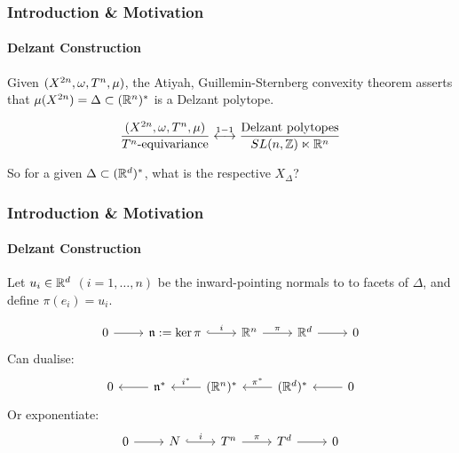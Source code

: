 \begin{frame}
	\frametitle{Introduction \& Motivation}
	\framesubtitle{Delzant Construction}
	
	\begin{rmk}
		Given $(X^{2n}, \omega, T^{n}, \mu)$, the Atiyah, Guillemin-Sternberg convexity theorem asserts that $\mu(X^{2n}) = \Delta \subset (\mathbb{R}^{n})^{\ast}$ is a Delzant polytope.
	\end{rmk}
	
	\begin{thm}[Delzant]
		$$
		\frac{(X^{2n}, \omega,T^{n},\mu)}{T^{n}\text{-equivariance}} \overset{1-1}{\longleftrightarrow} \frac{\text{Delzant polytopes}}{SL(n,\mathbb{Z}) \ltimes \mathbb{R}^{n}}
		$$
	\end{thm}
	
	\begin{qstn}
		So for a given $\Delta \subset (\mathbb{R}^{d})^{\ast}$, what is the respective $X_{\Delta}$?
	\end{qstn}


\end{frame}

\begin{frame}
	\frametitle{Introduction \& Motivation}
	\framesubtitle{Delzant Construction}
	
	Let $u_{i}\in \mathbb{R}^{d}$ $(i=1,\ldots,n)$ be the inward-pointing normals to to facets of $\Delta$, and define $\pi(e_{i}) = u_{i}$.
	
	\begin{equation*}
	\begin{tikzcd}[ampersand replacement=\&]
	0 \arrow[r] \& \mf{n}:= \ker \pi \arrow[r, "i",hook] \& \mathbb{R}^{n} \arrow[r, "\pi"] \& \mathbb{R}^{d} \arrow[r] \& 0
	\end{tikzcd}
	\end{equation*}
	Can dualise:
	\begin{equation*}
	\begin{tikzcd}[ampersand replacement=\&]
	0 \& \arrow[l] \mf{n}^{\ast} \& \arrow[l, "i^{\ast}",swap] (\mathbb{R}^{n})^{\ast} \& \arrow[l,"\pi^{\ast}",swap] (\RR^{d})^{\ast} \& \arrow[l] 0
	\end{tikzcd}
	\end{equation*}
	Or exponentiate:
	\begin{equation*}
	\begin{tikzcd}[ampersand replacement=\&]
	0 \arrow[r] \& N \arrow[r, "i",hook] \& T^{n} \arrow[r, "\pi"] \& T^{d} \arrow[r] \& 0
	\end{tikzcd}
	\end{equation*}
	
\end{frame}

